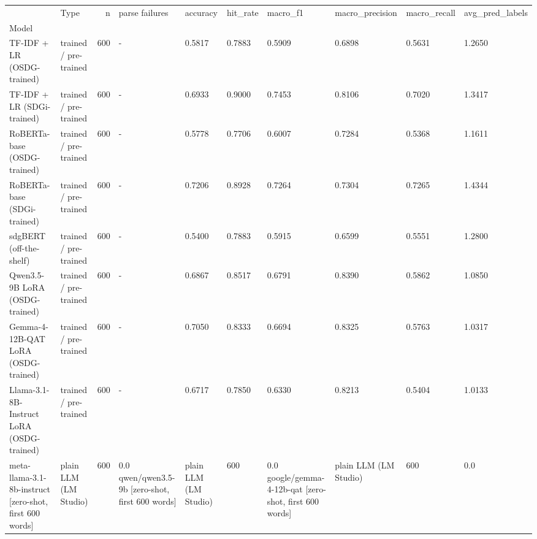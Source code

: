 \begin{tabular}{llrlllllll}
\toprule
 & Type & n & parse failures & accuracy & hit_rate & macro_f1 & macro_precision & macro_recall & avg_pred_labels \\
Model &  &  &  &  &  &  &  &  &  \\
\midrule
TF-IDF + LR (OSDG-trained) & trained / pre-trained & 600 & - & 0.5817 & 0.7883 & 0.5909 & 0.6898 & 0.5631 & 1.2650 \\
TF-IDF + LR (SDGi-trained) & trained / pre-trained & 600 & - & 0.6933 & 0.9000 & 0.7453 & 0.8106 & 0.7020 & 1.3417 \\
RoBERTa-base (OSDG-trained) & trained / pre-trained & 600 & - & 0.5778 & 0.7706 & 0.6007 & 0.7284 & 0.5368 & 1.1611 \\
RoBERTa-base (SDGi-trained) & trained / pre-trained & 600 & - & 0.7206 & 0.8928 & 0.7264 & 0.7304 & 0.7265 & 1.4344 \\
sdgBERT (off-the-shelf) & trained / pre-trained & 600 & - & 0.5400 & 0.7883 & 0.5915 & 0.6599 & 0.5551 & 1.2800 \\
Qwen3.5-9B LoRA (OSDG-trained) & trained / pre-trained & 600 & - & 0.6867 & 0.8517 & 0.6791 & 0.8390 & 0.5862 & 1.0850 \\
Gemma-4-12B-QAT LoRA (OSDG-trained) & trained / pre-trained & 600 & - & 0.7050 & 0.8333 & 0.6694 & 0.8325 & 0.5763 & 1.0317 \\
Llama-3.1-8B-Instruct LoRA (OSDG-trained) & trained / pre-trained & 600 & - & 0.6717 & 0.7850 & 0.6330 & 0.8213 & 0.5404 & 1.0133 \\
meta-llama-3.1-8b-instruct  [zero-shot, first 600 words] & plain LLM (LM Studio) & 600 & 0.0%
qwen/qwen3.5-9b  [zero-shot, first 600 words] & plain LLM (LM Studio) & 600 & 0.0%
google/gemma-4-12b-qat  [zero-shot, first 600 words] & plain LLM (LM Studio) & 600 & 0.0%
\bottomrule
\end{tabular}
